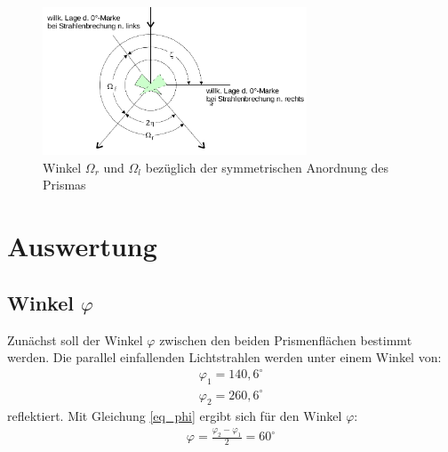 \begin{figure}[H]
\includegraphics[width=0.7\textwidth]{pics/prisma_ohm1.png}
\caption{Winkel $\Omega_r$ und $\Omega_l$ bezüglich der symmetrischen Anordnung des Prismas}
\label{pic:prisma_ohmlr}
\end{figure}
	 

\section{Auswertung}
\subsection{Winkel $\varphi$}
Zunächst soll der Winkel $\varphi$ zwischen den beiden Prismenflächen bestimmt werden. Die parallel einfallenden Lichtstrahlen werden unter einem Winkel von:
\begin{align*}
\varphi_1=140,6^\circ\\
\varphi_2=260,6^\circ
\end{align*}
reflektiert. Mit Gleichung \eqref{eq_phi} ergibt sich für den Winkel $\varphi$:
\begin{align*}
\varphi = \frac{\varphi_2-\varphi_1}{2}=60^\circ
\end{align*}
